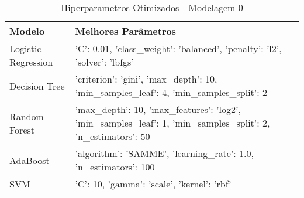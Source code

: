 \begin{table}[H] %
    \centering
    \caption{Hiperparametros Otimizados - Modelagem 0}
    \label{tab:melhores_parametros_otimizacao_modelagem_0}
    \renewcommand{\arraystretch}{1.25} %
    \begin{adjustwidth}{ -1in }{ -1in } %
    \centering %
    \small %
    \begin{tabular}{ll}
\toprule
             Modelo &                                                                                          Melhores Parâmetros \\
\midrule
Logistic Regression &                                  {'C': 0.01, 'class_weight': 'balanced', 'penalty': 'l2', 'solver': 'lbfgs'} \\
      Decision Tree &                        {'criterion': 'gini', 'max_depth': 10, 'min_samples_leaf': 4, 'min_samples_split': 2} \\
      Random Forest & {'max_depth': 10, 'max_features': 'log2', 'min_samples_leaf': 1, 'min_samples_split': 2, 'n_estimators': 50} \\
           AdaBoost &                                            {'algorithm': 'SAMME', 'learning_rate': 1.0, 'n_estimators': 100} \\
                SVM &                                                                 {'C': 10, 'gamma': 'scale', 'kernel': 'rbf'} \\
\bottomrule
\end{tabular}
    \end{adjustwidth}
    \renewcommand{\arraystretch}{1.0} %
\end{table}
